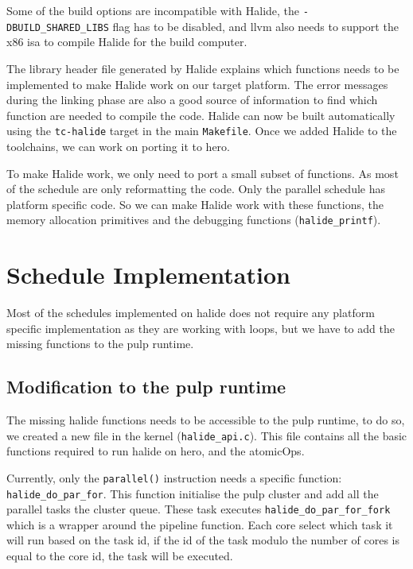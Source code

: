 	 Some of the build options are incompatible with Halide, the \texttt{-DBUILD\_SHARED\_LIBS} flag has to be disabled, and \gls{llvm} also needs to support the x86 \gls{isa} to compile Halide for the build computer.


	The library header file generated by Halide explains which functions needs to be implemented to make Halide work on our target platform.
	The error messages during the linking phase are also a good source of information to find which function are needed to compile the code. 
	Halide can now be built automatically using the \texttt{tc-halide}  target in the main \texttt{Makefile}.
	Once we added Halide to the toolchains, we can work on porting it to \gls{hero}.

	To make Halide work, we only need to port a small subset of functions. As most of the schedule are only reformatting the code.
	Only the parallel schedule has platform specific code. So we can make Halide work with these functions, the memory allocation primitives and the debugging functions (\texttt{halide\_printf}).

\section{Schedule Implementation }
	Most of the schedules implemented on halide does not require any platform specific implementation as they are working with loops, but we have to add the missing functions to the \gls{pulp} runtime.

	\subsection{Modification to the \acrshort{pulp} runtime}

	The missing halide functions needs to be accessible to the \gls{pulp} runtime, to do so, we created a new file in the kernel (\texttt{halide\_api.c}). 
	This file contains all the basic functions required to run halide on \gls{hero}, and the \glspl{atomicOp}.

	Currently, only the \texttt{parallel()} instruction needs a specific function: \texttt{halide\_do\_par\_for}.
	 This function initialise the \gls{pulp} cluster and add all the parallel tasks the cluster queue. These task executes \texttt{halide\_do\_par\_for\_fork} which is a wrapper around the pipeline function.
	Each core select which task it will run based on the task id, if the id of the task modulo the number of cores is equal to the core id, the task will be executed.

